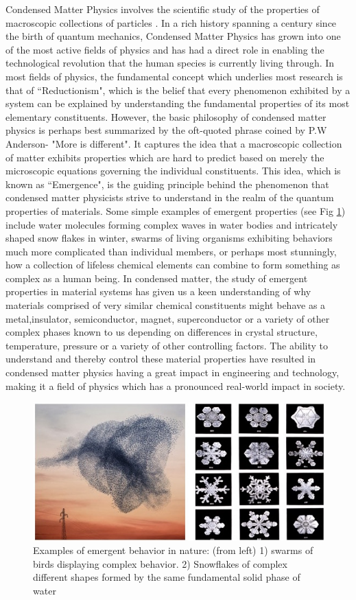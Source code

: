 \documentclass[10pt]{ruthesis}
\begin{document}
Condensed Matter Physics involves the scientific study of the properties of macroscopic collections of particles . In a rich history spanning a century since the birth of quantum mechanics, Condensed Matter Physics has grown into one of the most active fields of physics and has had a direct role in enabling the technological revolution that the human species is currently living through. In most fields of physics, the fundamental concept which underlies most research is that of ``Reductionism", which is the belief that every phenomenon exhibited by a system can be explained by understanding the fundamental properties of its most elementary constituents. However, the basic philosophy of  condensed matter physics is perhaps best summarized by the oft-quoted phrase coined by P.W Anderson- "More is different". It captures the idea that a macroscopic collection of matter exhibits properties which are hard to predict based on merely the microscopic equations governing the individual constituents. This idea, which is known as  ``Emergence", is the guiding principle behind the phenomenon that  condensed matter physicists strive to understand in the realm of the quantum properties of materials. Some simple examples of emergent properties (see Fig \ref{Emergence}) include water molecules forming complex waves in water bodies and intricately shaped snow flakes in winter, swarms of living organisms exhibiting behaviors much more complicated than individual members, or perhaps most stunningly, how a collection of lifeless chemical elements can combine to form something as complex as a human being. In condensed matter, the study of emergent properties in material systems has given us a keen understanding of why  materials comprised of very similar chemical constituents might behave as a metal,insulator, semiconductor, magnet, superconductor or a variety of other complex phases known to us depending on differences in crystal structure, temperature, pressure or a variety of other controlling factors. The ability to understand and thereby control these material properties have resulted in condensed matter physics having a great impact in engineering and technology, making it a field of physics which has a pronounced real-world impact in society.
\linebreak
\begin{figure}[H]
\includegraphics[width=\columnwidth]{Emergence.jpg}
\caption{Examples of emergent behavior in nature: (from left) 1) swarms of birds displaying complex behavior. 2) Snowflakes of complex different shapes formed by the same fundamental solid phase of water \protect \footnotemark \label{Emergence} }

\end{figure}
\end{document}
